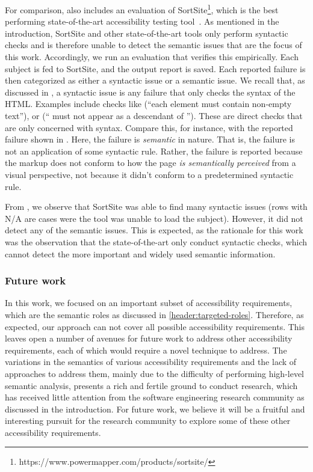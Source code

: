For comparison,  also includes an evaluation 
of SortSite\footnote{https://www.powermapper.com/products/sortsite/}, 
which is the best performing state-of-the-art 
accessibility testing tool~\cite{ukgov:audit:2018}. 
As mentioned in the introduction, SortSite and other state-of-the-art tools 
only perform syntactic checks and is therefore 
unable to detect the semantic issues 
that are the focus of this work. Accordingly, we run 
an evaluation that verifies this empirically. 
Each subject is fed to SortSite, and the output report is saved. 
Each reported failure is then 
categorized as either a syntactic issue or a semantic issue. 
We recall that, as discussed in , 
a syntactic issue is any failure that only checks the syntax 
of the HTML. Examples include checks like (``each  
element must contain non-empty text''), or (`` must not 
appear as a descendant of ''). 
These are direct checks that are only concerned with syntax. 
Compare this, for instance, with the reported failure shown in . 
Here, the failure is \emph{semantic} in nature. That is, the failure 
is not an application of some syntactic rule. Rather, 
the failure is reported because the markup does not conform to how the 
page \emph{is semantically perceived} from a visual perspective, not 
because it didn't conform to a predetermined syntactic rule. 

From , we observe that SortSite was able to 
find many syntactic issues 
(rows with N/A are cases were the tool was unable to load the subject). 
However, it did not detect any of the semantic issues. 
This is expected, as the rationale for this work was the observation 
that the state-of-the-art only conduct syntactic checks, which cannot 
detect the more important and widely used semantic information. 

\subsubsection{Future work}
In this work, we focused on an important subset of accessibility requirements, 
which are the semantic roles as discussed in \ref{header:targeted-roles}. 
Therefore, as expected, our approach 
can not cover all possible accessibility requirements. 
This leaves open a number of avenues 
for future work to address other accessibility requirements, each of which would require 
a novel technique to address. 
The variations in the semantics of various accessibility requirements and the lack of approaches 
to address them, mainly due to the difficulty of performing high-level semantic analysis, 
presents a rich and fertile ground to conduct research, which has received little attention 
from the software engineering research community as discussed in the introduction. 
For future work, we believe it will be a fruitful and interesting pursuit for the research 
community to explore some of these other accessibility requirements.

